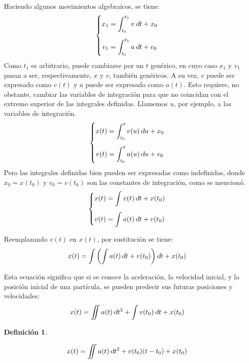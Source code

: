 \documentclass[a5paper,12pt,twoside]{book}
\newtheorem{defn}{{Definición}}[chapter]
\begin{document}
Haciendo algunos movimientos algebraicos, se tiene:
\[
  \left\{
    \begin{aligned}
    x_1 &= \displaystyle\int_{t_0}^{t_1} v \, \textsl{d} t + x_0
    \\[1ex]
    v_1 &= \displaystyle\int_{t_0}^{t_1} a \, \textsl{d} t + v_0
    \end{aligned}
  \right.
\]
Como $t_1$ es arbitrario, puede cambiarse por un $t$ genérico, en cuyo caso $x_1$ y $v_1$ pasan a ser, respectivamente, $x$ y $v$, también genéricos.
A su vez, $v$ puede ser expresado como $v(t)$ y $a$ puede ser expresado como $a(t)$.
Esto requiere, no obstante, cambiar las variables de integración para que no coincidan con el extremo superior de las integrales definidas.
Llamemos $u$, por ejemplo, a las variables de integración.
\[
  \left\{
    \begin{aligned}
    x(t) &= \displaystyle\int_{t_0}^{t} v(u) \, \textsl{d} u + x_0
    \\[1ex]
    v(t) &= \displaystyle\int_{t_0}^{t} a(u) \, \textsl{d} u + v_0
    \end{aligned}
  \right.
\]
Pero las integrales definidas bien pueden ser expresadas como indefinidas, donde $x_0 = x\left(t_0\right)$ y $v_0 = v\left(t_0\right)$ son las constantes de integración, como se mencionó.
\[
  \left\{
    \begin{aligned}
      x(t) &= \displaystyle\int v(t) \, \textsl{d} t + x(t_0)
      \\[1ex]
      v(t) &= \displaystyle\int a(t) \, \textsl{d} t + v(t_0)
    \end{aligned}
  \right.
\]

Reemplazando $v(t)$ en $x(t)$, por sustitución se tiene:
\[ x(t) = \int \left( \int a(t) \, \textsl{d} t + v(t_0) \right) \textsl{d} t + x(t_0) \]

Esta ecuación significa que si se conoce la aceleración, la velocidad inicial, y la posición inicial de una partícula, se pueden predecir sus futuras posiciones y velocidades:
\[ x(t) = \iint a(t) \, \textsl{d} t^2 + \int v(t_0) \, \textsl{d} t + x(t_0) \]

\begin{mdframed}[style=MyFrame1]
    \begin{defn}
        \label{defn:generalMovementEqn}
    \end{defn}
    \begin{equation*}
        x(t) = \displaystyle\iint a(t) \, \textsl{d} t^2 + v(t_0) (t-t_0)   + x(t_0)
    \end{equation*}
\end{mdframed}
\end{document}

